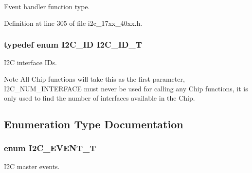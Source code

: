 Event handler function type. 



Definition at line 305 of file i2c\+\_\+17xx\+\_\+40xx.\+h.

\subsubsection[{\texorpdfstring{I2\+C\+\_\+\+I\+D\+\_\+T}{I2C_ID_T}}]{\setlength{\rightskip}{0pt plus 5cm}typedef enum {\bf I2\+C\+\_\+\+ID}  {\bf I2\+C\+\_\+\+I\+D\+\_\+T}}\hypertarget{group__I2C__17XX__40XX_ga957556a4d900506cd4cba8427afd81e6}{}\label{group__I2C__17XX__40XX_ga957556a4d900506cd4cba8427afd81e6}


I2C interface I\+Ds. 

\begin{DoxyNote}{Note}
All Chip functions will take this as the first parameter, I2\+C\+\_\+\+N\+U\+M\+\_\+\+I\+N\+T\+E\+R\+F\+A\+CE must never be used for calling any Chip functions, it is only used to find the number of interfaces available in the Chip. 
\end{DoxyNote}


\subsection{Enumeration Type Documentation}
\subsubsection[{\texorpdfstring{I2\+C\+\_\+\+E\+V\+E\+N\+T\+\_\+T}{I2C_EVENT_T}}]{\setlength{\rightskip}{0pt plus 5cm}enum {\bf I2\+C\+\_\+\+E\+V\+E\+N\+T\+\_\+T}}\hypertarget{group__I2C__17XX__40XX_gacb2cd4e03ea48339d327e4f387441bf3}{}\label{group__I2C__17XX__40XX_gacb2cd4e03ea48339d327e4f387441bf3}


I2C master events. 

